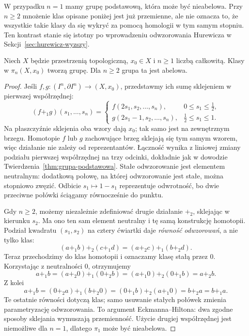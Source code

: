 W przypadku $n=1$ mamy grupę podstawową, która może być
nieabelowa. Przy $n\geq2$ mnożenie klas opisane poniżej jest już
przemienne, ale nie oznacza to, że wszystkie takie klasy da się
wykryć za pomocą homologii w tym samym stopniu.
Ten kontrast stanie się istotny po wprowadzeniu odwzorowania
Hurewicza w Sekcji~\ref{sec:hurewicz-wyzszy}.

\begin{twierdzenie}
\label{thm:pi-n-abelowe}
Niech $X$ będzie przestrzenią topologiczną, $x_0\in X$
i $n\geq1$ liczbą całkowitą.
Klasy w $\pi_n(X,x_0)$ tworzą grupę.
Dla $n\geq2$ grupa ta jest abelowa.
\end{twierdzenie}
\begin{proof}
Jeśli $f,g:(I^n,\partial I^n)\to(X,x_0)$,
przedstawmy ich sumę sklejeniem w pierwszej
współrzędnej:
\[
 (f+_1g)(s_1,\ldots,s_n)=
 \begin{cases}
 f(2s_1,s_2,\ldots,s_n),&0\leq s_1\leq\tfrac12,\\
 g(2s_1-1,s_2,\ldots,s_n),&\tfrac12\leq s_1\leq1.
 \end{cases}
\]
Na płaszczyźnie sklejenia oba wzory dają
$x_0$; tak samo jest na zewnętrznym brzegu.
Homotopie $f$ lub $g$ zachowujące brzeg
sklejają się tym samym wzorem, więc działanie
nie zależy od reprezentantów. Łączność
wynika z liniowej zmiany podziału pierwszej
współrzędnej na trzy odcinki, dokładnie jak
w dowodzie Twierdzenia~\ref{thm:grupa-podstawowa}.
Stałe odwzorowanie jest elementem neutralnym:
dodatkową połowę, na której odwzorowanie jest stałe,
można stopniowo zwęzić. Odbicie
$s_1\mapsto1-s_1$ reprezentuje odwrotność,
bo dwie przeciwne połówki ściągamy
równocześnie do punktu.

Gdy $n\geq2$, możemy niezależnie zdefiniować
drugie działanie $+_2$, sklejając w kierunku
$s_2$. Ma ono ten sam element neutralny
i tę samą konstrukcję homotopii. Podział
kwadratu $(s_1,s_2)$ na cztery ćwiartki
daje \emph{równość odwzorowań}, a nie tylko klas:
\[
 (a+_1 b)+_2(c+_1d)
   =(a+_2c)+_1(b+_2d).
\]
Teraz przechodzimy do klas homotopii i oznaczamy klasę stałą przez $0$.
Korzystając z neutralności $0$, otrzymujemy
\[
 a+_1b=(a+_2 0)+_1(0+_2 b)
      =(a+_1 0)+_2(0+_1 b)=a+_2b.
\]
Z kolei
\[
 a+_1b=(0+_2a)+_1(b+_2 0)
      =(0+_1b)+_2(a+_1 0)=b+_2a=b+_1a.
\]
Te ostatnie równości dotyczą klas; samo usuwanie stałych połówek
zmienia parametryzację odwzorowania.
To argument Eckmanna--Hiltona: dwa
zgodne sposoby sklejania wymuszają
przemienność. Użycie drugiej
współrzędnej jest niemożliwe dla
$n=1$, dlatego $\pi_1$ może być
nieabelowa.
\end{proof}

